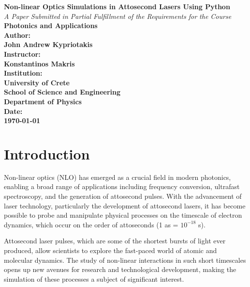 \documentclass[12pt]{article}
\begin{document}
\begin{titlepage}
    \centering
    \vspace*{1in}
    
    {\Huge \textbf{Non-linear Optics Simulations in Attosecond Lasers Using Python}}\\[2cm]
    
    \textit{A Paper Submitted in Partial Fulfillment of the Requirements for the Course}\\[0.5cm]
    
    \textbf{Photonics and Applications}\\[2cm]
    
    \textbf{Author:}\\
    [0.5cm]
    \textbf{John Andrew Kypriotakis}\\[1.5cm]
    
    \textbf{Instructor:}\\
    [0.5cm]
    \textbf{Konstantinos Makris}\\[1.5cm]
    
    \textbf{Institution:}\\
    [0.5cm]
    \textbf{University of Crete}\\
    \textbf{School of Science and Engineering}\\
    \textbf{Department of Physics}\\[2cm]
    
    \textbf{Date:}\\
    [0.5cm]
    \textbf{\today}
    
    \vfill
\end{titlepage}

\newpage

\tableofcontents
\newpage

\section{Introduction}\label{sec:intro}

Non-linear optics (NLO) has emerged as a crucial field in modern photonics, enabling a broad range of applications including frequency conversion, ultrafast spectroscopy, and the generation of attosecond pulses. With the advancement of laser technology, particularly the development of attosecond lasers, it has become possible to probe and manipulate physical processes on the timescale of electron dynamics, which occur on the order of attoseconds (1 as = $10^{-18}$ s).

Attosecond laser pulses, which are some of the shortest bursts of light ever produced, allow scientists to explore the fast-paced world of atomic and molecular dynamics. The study of non-linear interactions in such short timescales opens up new avenues for research and technological development, making the simulation of these processes a subject of significant interest.
\end{document}
